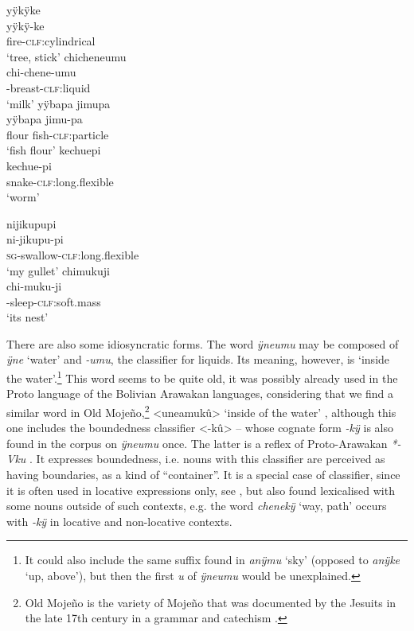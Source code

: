 \ea\label{ex:noun-clf}
  \ea\label{ex:noun-clf.1}
\begingl
\glpreamble yÿkÿke\\
\gla yÿkÿ-ke\\
\glb fire-\textsc{clf:}cylindrical\\
\glft ‘tree, stick’
\endgl
  \ex\label{ex:noun-clf.2}
\begingl
\glpreamble chicheneumu\\
\gla chi-chene-umu\\
-breast-\textsc{clf:}liquid\\
\glft ‘milk’
\endgl
  \ex\label{ex:noun-clf.3}
\begingl
\glpreamble yÿbapa jimupa\\
\gla yÿbapa jimu-pa\\
\glb flour fish-\textsc{clf:}particle\\
\glft ‘fish flour’
\endgl
  \ex\label{ex:noun-clf.4}
\begingl
\glpreamble kechuepi\\
\gla kechue-pi\\
\glb snake-\textsc{clf:}long.flexible\\
\glft ‘worm’
\endgl
\z
\xe

\ea\label{ex:verb-clf}
  \ea\label{ex:verb-clf.1}
\begingl
\glpreamble nijikupupi\\
\gla ni-jikupu-pi\\
\textsc{sg}-swallow-\textsc{clf:}long.flexible\\
\glft ‘my gullet’
\endgl
  \ex\label{ex:verb-clf.2}
\begingl
\glpreamble chimukuji\\
\gla chi-muku-ji\\
-sleep-\textsc{clf:}soft.mass\\
\glft ‘its nest’
\endgl
\z
\xe

There are also some idiosyncratic forms. The word \textit{ÿneumu} may be composed of \textit{ÿne} ‘water’ and \textit{-umu}, the classifier for liquids. Its meaning, however, is ‘inside the water’.\footnote{It could also include the same suffix found in \textit{anÿmu} ‘sky’ (opposed to \textit{anÿke} ‘up, above’), but then the first \textit{u} of \textit{ÿneumu} would be unexplained.} This word seems to be quite old, it was possibly already used in the Proto language of the Bolivian Arawakan languages, considering that we find a similar word in Old Mojeño,\footnote{Old Mojeño is the variety of Mojeño that was documented by the Jesuits in the late 17th century in a grammar and catechism \citep[]{Marban1894}.} <uneamukû> ‘inside of the water’ \citep[94]{Marban1894}, although this one includes the boundedness classifier <-kû>  – whose cognate form \textit{-kÿ} is also found in the corpus on \textit{ÿneumu} once. The latter is a reflex of Proto-Arawakan \textit{*-Vku} \citep[cf.][384]{Payne1991}. It expresses boundedness, i.e. nouns with this classifier are perceived as having boundaries, as a kind of “container”. It is a special case of classifier, since it is often used in locative expressions only, see , but also found lexicalised with some nouns outside of such contexts, e.g. the word \textit{chenekÿ} ‘way, path’ occurs with \textit{-kÿ} in locative and non-locative contexts.

